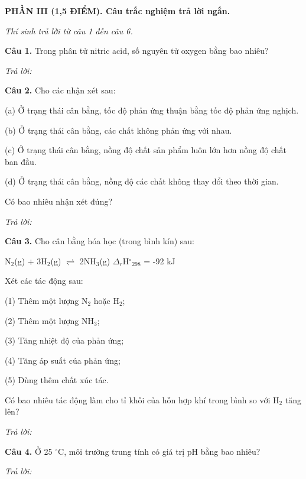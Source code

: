 \documentclass[11pt,a4paper]{article}
\begin{document}
\vspace{6pt}
{\color{myGreen}\bfseries\large PHẦN III (1,5 ĐIỂM). Câu trắc nghiệm trả lời ngắn.}

\textit{\small Thí sinh trả lời từ câu 1 đến câu 6.}
\vspace{3pt}

\textbf{Câu 1.} Trong phân tử nitric acid, số nguyên tử oxygen bằng bao nhiêu?

\textit{Trả lời:} \dotfill\par\vspace{2pt}

\textbf{Câu 2.} Cho các nhận xét sau:

(a) Ở trạng thái cân bằng, tốc độ phản ứng thuận bằng tốc độ phản ứng nghịch.

(b) Ở trạng thái cân bằng, các chất không phản ứng với nhau.

(c) Ở trạng thái cân bằng, nồng độ chất sản phẩm luôn lớn hơn nồng độ chất ban đầu.

(d) Ở trạng thái cân bằng, nồng độ các chất không thay đổi theo thời gian.

Có bao nhiêu nhận xét đúng?

\textit{Trả lời:} \dotfill\par\vspace{2pt}

\textbf{Câu 3.} Cho cân bằng hóa học (trong bình kín) sau:

N$_{2}$(g) + 3H$_{2}$(g) $\rightleftharpoons$ 2NH$_{3}$(g)    $\Delta$$_{r}$H$^\circ$$_{298}$ = -92 kJ

Xét các tác động sau:

(1) Thêm một lượng N$_{2}$ hoặc H$_{2}$;

(2) Thêm một lượng NH$_{3}$;

(3) Tăng nhiệt độ của phản ứng;

(4) Tăng áp suất của phản ứng;

(5) Dùng thêm chất xúc tác.

Có bao nhiêu tác động làm cho tỉ khối của hỗn hợp khí trong bình so với H$_{2}$ tăng lên?

\textit{Trả lời:} \dotfill\par\vspace{2pt}

\textbf{Câu 4.} Ở 25 $^\circ\text{C}$, môi trường trung tính có giá trị pH bằng bao nhiêu?

\textit{Trả lời:} \dotfill\par\vspace{2pt}
\end{document}
